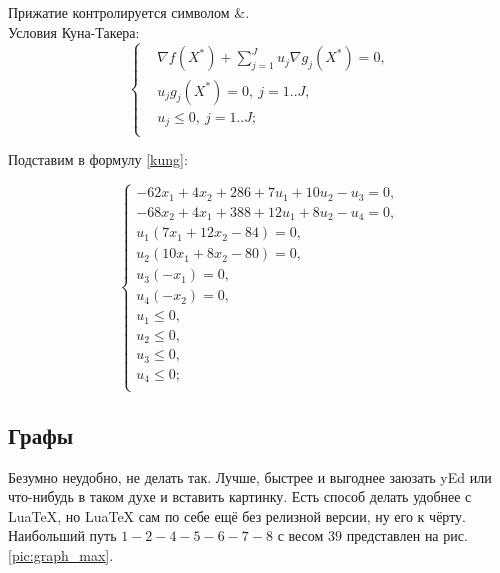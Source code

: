 Прижатие контролируется символом \&. \\

Условия Куна-Такера:
\begin{equation}
\left\{\begin{aligned}
&\nabla f(X^*)+\sum_{j=1}^{J} u_j \nabla g_j(X^*)=0,\\
&u_j g_j(X^*)=0,~ j=1..J,\\
&u_j \leq 0,~ j=1..J;\\
\end{aligned}\right.
\label{kung}
\end{equation}

Подставим в формулу \eqref{kung}:

\begin{equation*}
\left\{\begin{aligned}
-62x_1+4x_2+286+7u_1+10u_2-u_3=0,\\
-68x_2+4x_1+388+12u_1+8u_2-u_4=0,\\
u_1(7x_1+12x_2-84)=0,\\
u_2(10x_1+8x_2-80)=0,\\
u_3(-x_1)=0,\\
u_4(-x_2)=0,\\
u_1\leq 0,\\
u_2\leq 0,\\
u_3\leq 0,\\
u_4\leq 0;\\
\end{aligned}\right.
\end{equation*}

\subsection{Графы}

Безумно неудобно, не делать так. Лучше, быстрее и выгоднее заюзать yEd или что-нибудь в таком духе и вставить картинку. Есть способ делать удобнее с LuaTeX, но LuaTeX сам по себе ещё без релизной версии, ну его к чёрту. \\

Наибольший путь $1-2-4-5-6-7-8$ с весом $39$ представлен на рис. \ref{pic:graph_max}.

